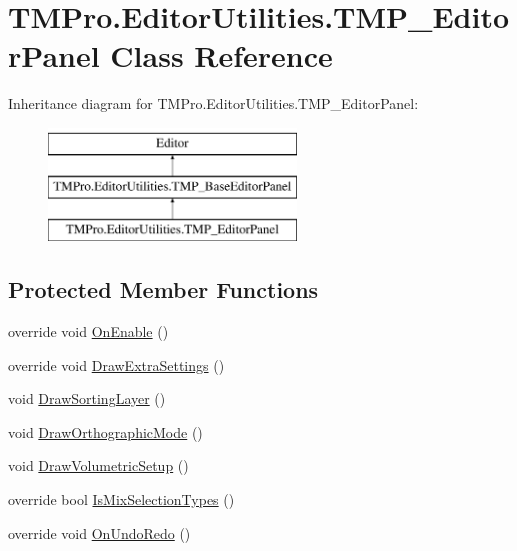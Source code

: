 \hypertarget{class_t_m_pro_1_1_editor_utilities_1_1_t_m_p___editor_panel}{}\section{T\+M\+Pro.\+Editor\+Utilities.\+T\+M\+P\+\_\+\+Editor\+Panel Class Reference}
\label{class_t_m_pro_1_1_editor_utilities_1_1_t_m_p___editor_panel}
Inheritance diagram for T\+M\+Pro.\+Editor\+Utilities.\+T\+M\+P\+\_\+\+Editor\+Panel\+:\begin{figure}[H]
\begin{center}
\leavevmode
\includegraphics[height=3.000000cm]{class_t_m_pro_1_1_editor_utilities_1_1_t_m_p___editor_panel}
\end{center}
\end{figure}
\subsection*{Protected Member Functions}
\begin{DoxyCompactItemize}
\item 
override void \mbox{\hyperlink{class_t_m_pro_1_1_editor_utilities_1_1_t_m_p___editor_panel_a5c6c52a7543455d4968fb1c438f73c18}{On\+Enable}} ()
\item 
override void \mbox{\hyperlink{class_t_m_pro_1_1_editor_utilities_1_1_t_m_p___editor_panel_a1327e18c85ce07f1459cf271359a6048}{Draw\+Extra\+Settings}} ()
\item 
void \mbox{\hyperlink{class_t_m_pro_1_1_editor_utilities_1_1_t_m_p___editor_panel_ae44125d3f3abe73058d2f3309d1585c4}{Draw\+Sorting\+Layer}} ()
\item 
void \mbox{\hyperlink{class_t_m_pro_1_1_editor_utilities_1_1_t_m_p___editor_panel_a8a7a662c7d2669cf4dd04c7f51d849eb}{Draw\+Orthographic\+Mode}} ()
\item 
void \mbox{\hyperlink{class_t_m_pro_1_1_editor_utilities_1_1_t_m_p___editor_panel_a511261d43c44201a3f991afdef66d422}{Draw\+Volumetric\+Setup}} ()
\item 
override bool \mbox{\hyperlink{class_t_m_pro_1_1_editor_utilities_1_1_t_m_p___editor_panel_afd65387972f0d704f001c4563850e610}{Is\+Mix\+Selection\+Types}} ()
\item 
override void \mbox{\hyperlink{class_t_m_pro_1_1_editor_utilities_1_1_t_m_p___editor_panel_a30162b44fb34ae79fc36af4984f49062}{On\+Undo\+Redo}} ()
\end{DoxyCompactItemize}

